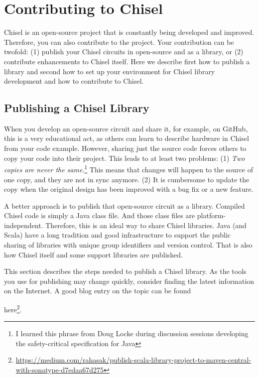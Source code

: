 \documentclass[%
    10pt,
    headinclude, footinclude=false,
    openright, %
    notitlepage,
    cleardoublepage=empty,
    headsepline,
    numbers=noenddot,
    bibliography=totoc, index=totoc,
    ]{scrbook}
\newif\ifbook
\newcommand{\myref}[2]{\href{#1}{#2}}
\renewcommand{\myref}[2]{{#2}{\footnote{\url{#1}}}}
\begin{document}
\chapter{Contributing to Chisel}


Chisel is an open-source project that is constantly being developed and improved.
Therefore, you can also contribute to the project. Your contribution can be twofold:
(1) publish your Chisel circuits in open-source and as a library, or (2) contribute
enhancements to Chisel itself.
Here we describe first how to publish a library and second how to
set up your environment for Chisel library development and how to contribute
to Chisel.

\section{Publishing a Chisel Library}

When you develop an open-source circuit and share it, for example, on GitHub,
this is a very educational act, as others can learn to describe hardware in Chisel from your code example.
However, sharing just the source code forces others to copy your code into their
project. This leads to at least two problems: (1) \emph{Two copies are never the
same}.\footnote{I learned this phrase from Doug Locke during discussion sessions
developing the safety-critical specification for Java} This means that changes will
happen to the source of one copy, and they are not in sync anymore.
(2) It is cumbersome to update the copy when the original design has been improved
with a bug fix or a new feature.

A better approach is to publish that open-source circuit as a library.
Compiled Chisel code is simply a Java class file. And those class files are
platform-independent. Therefore, this is an ideal way to share Chisel libraries.
Java (and Scala) have a long tradition and good infrastructure to support
the public sharing of libraries with unique group identifiers and version control.
That is also how Chisel itself and some support libraries are published.

This section describes the steps needed to publish a Chisel library. As the tools you
use for publishing may change quickly, consider finding the latest information on the
Internet. A good blog entry on the topic can be found
\ifbook
\myref{https://medium.com/rahasak/}{here}.
\else
\myref{https://medium.com/rahasak/publish-scala-library-project-to-maven-central-with-sonatype-d7edaa67d275}{here}.
\fi
\end{document}
